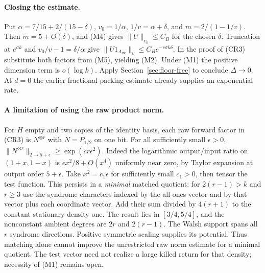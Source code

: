 \paragraph{Closing the estimate.}
Put $\alpha=7/15+2/(15-\delta)$, $v_0=1/\alpha$, $1/v=\alpha+\delta$, and $m=2/(1-1/v)$. Then $m=5+O(\delta)$, and (M4) gives $\|U\|_{v_0}\le C_B$ for the chosen $\delta$. Truncation at $e^{\sigma k}$ and $v_0/v-1=\delta/\alpha$ give $\|U1_{A_{\sigma k}}\|_v\le C_B e^{-c\sigma k\delta}$. In the proof of (CR3) substitute both factors from (M5), yielding (M2). Under (M1) the positive dimension term is $o(\log k)$. Apply Section~\ref{sec:floor-free} to conclude $\Delta\to0$. At $d=0$ the earlier fractional-packing estimate already supplies an exponential rate.

\paragraph{A limitation of using the raw product norm.}
For $H$ empty and two copies of the identity basis, each raw forward factor in (CR3) is $N^{\otimes r}$ with $N=P_{1/2}$ on one bit. For all sufficiently small $\epsilon>0$,
$\|N^{\otimes r}\|_{2\to5+\epsilon}\ge\exp(c r\epsilon^2)$.
Indeed the logarithmic output/input ratio on $(1+x,1-x)$ is $\epsilon x^2/8+O(x^4)$ uniformly near zero, by Taylor expansion at output order $5+\epsilon$. Take $x^2=c_1\epsilon$ for sufficiently small $c_1>0$, then tensor the test function.
This persists in a \emph{minimal} matched quotient: for $2(r-1)>k$ and $r\ge3$ use the syndrome characters indexed by the all-ones vector and by that vector plus each coordinate vector. Add their sum divided by $4(r+1)$ to the constant stationary density one. The result lies in $[3/4,5/4]$, and the nonconstant ambient degrees are $2r$ and $2(r-1)$. The Walsh support spans all $r$ syndrome directions. Positive symmetric scaling supplies its potential. Thus matching alone cannot improve the unrestricted raw norm estimate for a minimal quotient. The test vector need not realize a large killed return for that density; necessity of (M1) remains open.
